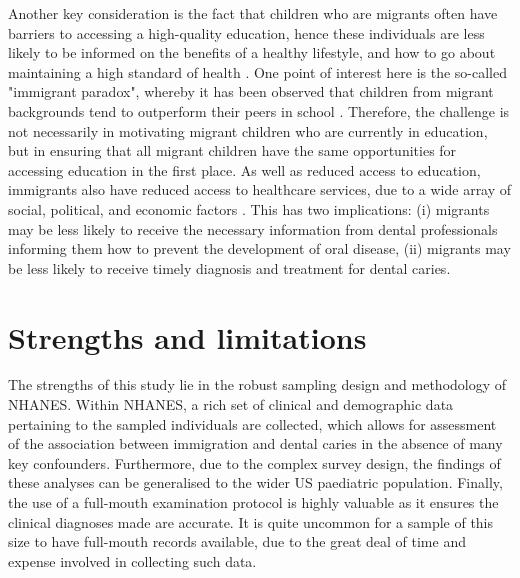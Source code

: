 Another key consideration is the fact that children who are migrants often have barriers to accessing a high-quality education, hence these individuals are less likely to be informed on the benefits of a healthy lifestyle, and how to go about maintaining a high standard of health \citep{abubakr2018}. One point of interest here is the so-called "immigrant paradox", whereby it has been observed that children from migrant backgrounds tend to outperform their peers in school \citep{crosnoe2011}. Therefore, the challenge is not necessarily in motivating migrant children who are currently in education, but in ensuring that all migrant children have the same opportunities for accessing education in the first place. As well as reduced access to education, immigrants also have reduced access to healthcare services, due to a wide array of social, political, and economic factors \citep{khullar2019}. This has two implications: (i) migrants may be less likely to receive the necessary information from dental professionals informing them how to prevent the development of oral disease, (ii) migrants may be less likely to receive timely diagnosis and treatment for dental caries.

\section{Strengths and limitations}

The strengths of this study lie in the robust sampling design and methodology of NHANES. Within NHANES, a rich set of clinical and demographic data pertaining to the sampled individuals are collected, which allows for assessment of the association between immigration and dental caries in the absence of many key confounders. Furthermore, due to the complex survey design, the findings of these analyses can be generalised to the wider US paediatric population. Finally, the use of a full-mouth examination protocol is highly valuable as it ensures the clinical diagnoses made are accurate. It is quite uncommon for a sample of this size to have full-mouth records available, due to the great deal of time and expense involved in collecting such data.

